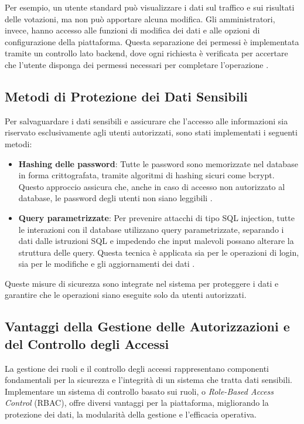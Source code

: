 Per esempio, un utente standard può visualizzare i dati sul traffico e sui risultati delle votazioni, ma non può apportare alcuna modifica. Gli amministratori, invece, hanno accesso alle funzioni di modifica dei dati e alle opzioni di configurazione della piattaforma. Questa separazione dei permessi è implementata tramite un controllo lato backend, dove ogni richiesta è verificata per accertare che l'utente disponga dei permessi necessari per completare l'operazione \cite{sandhu1996role}.

\subsection{Metodi di Protezione dei Dati Sensibili}
Per salvaguardare i dati sensibili e assicurare che l'accesso alle informazioni sia riservato esclusivamente agli utenti autorizzati, sono stati implementati i seguenti metodi:

\begin{itemize}
    \item \textbf{Hashing delle password}: Tutte le password sono memorizzate nel database in forma crittografata, tramite algoritmi di hashing sicuri come bcrypt. Questo approccio assicura che, anche in caso di accesso non autorizzato al database, le password degli utenti non siano leggibili \cite{menezes1996handbook}.

    \item \textbf{Query parametrizzate}: Per prevenire attacchi di tipo SQL injection, tutte le interazioni con il database utilizzano query parametrizzate, separando i dati dalle istruzioni SQL e impedendo che input malevoli possano alterare la struttura delle query. Questa tecnica è applicata sia per le operazioni di login, sia per le modifiche e gli aggiornamenti dei dati \cite{halfond2006classification}.
\end{itemize}

Queste misure di sicurezza sono integrate nel sistema per proteggere i dati e garantire che le operazioni siano eseguite solo da utenti autorizzati.


\subsection{Vantaggi della Gestione delle Autorizzazioni e del Controllo degli Accessi}
La gestione dei ruoli e il controllo degli accessi rappresentano componenti fondamentali per la sicurezza e l'integrità di un sistema che tratta dati sensibili. Implementare un sistema di controllo basato sui ruoli, o \textit{Role-Based Access Control} (RBAC), offre diversi vantaggi per la piattaforma, migliorando la protezione dei dati, la modularità della gestione e l'efficacia operativa.

